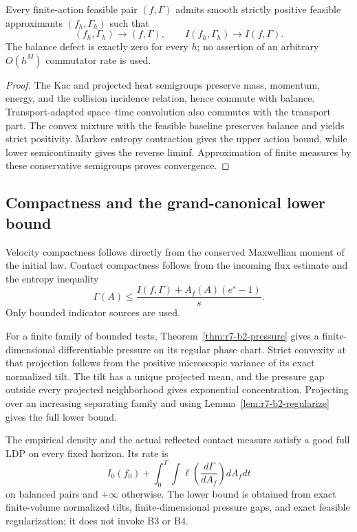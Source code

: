 \begin{lemma}
\label{lem:r7-b2-regularize}
Every finite-action feasible pair $(f,\Gamma)$ admits smooth strictly positive
feasible approximants $(f_h,\Gamma_h)$ such that
\[
 (f_h,\Gamma_h)\to(f,\Gamma),
 \qquad
 I(f_h,\Gamma_h)\to I(f,\Gamma).
\]
The balance defect is exactly zero for every $h$; no assertion of an arbitrary
$O(h^M)$ commutator rate is used.
\end{lemma}

\begin{proof}
The Kac and projected heat semigroups preserve mass, momentum, energy, and the
collision incidence relation, hence commute with balance.  Transport-adapted
space--time convolution also commutes with the transport part.  The convex
mixture with the feasible baseline preserves balance and yields strict
positivity.  Markov entropy contraction gives the upper action bound, while
lower semicontinuity gives the reverse liminf.  Approximation of finite
measures by these conservative semigroups proves convergence.
\end{proof}

\subsection{Compactness and the grand-canonical lower bound}

Velocity compactness follows directly from the conserved Maxwellian moment of
the initial law.  Contact compactness follows from the incoming flux estimate
and the entropy inequality
\[
 \Gamma(A)\le
 \frac{I(f,\Gamma)+A_f(A)(e^s-1)}s.
\]
Only bounded indicator sources are used.

For a finite family of bounded tests, Theorem~\ref{thm:r7-b2-pressure} gives a
finite-dimensional differentiable pressure on its regular phase chart.
Strict convexity at that projection follows from the positive microscopic
variance of its exact normalized tilt.  The tilt has a unique projected mean,
and the pressure gap outside every projected neighborhood gives exponential
concentration.  Projecting over an increasing separating family and using
Lemma~\ref{lem:r7-b2-regularize} gives the full lower bound.

\begin{theorem}
\label{thm:r7-b2-gc}
The empirical density and the actual reflected contact measure satisfy a good
full LDP on every fixed horizon.  Its rate is
\[
 I_0(f_0)+\int_0^T
 \int\ell\left(\frac{d\Gamma}{dA_f}\right)dA_fdt
\]
on balanced pairs and $+\infty$ otherwise.  The lower bound is obtained from
exact finite-volume normalized tilts, finite-dimensional pressure gaps, and
exact feasible regularization; it does not invoke B3 or B4.
\end{theorem}

